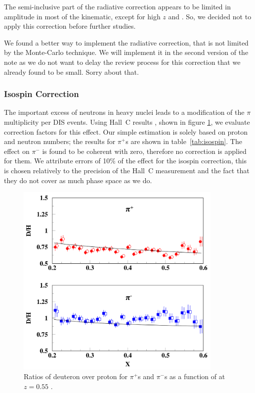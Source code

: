 The semi-inclusive part of the radiative correction appears to be limited 
in amplitude in most of the 
kinematic, except for high $z$ and \ptp. So, we decided not to apply this 
correction before further studies.

{\color{red} We found a better way to implement the radiative correction,
that is not limited by the Monte-Carlo technique. We will implement it in
the second version of the note as we do not want to delay the review process for
this correction that we already found to be small. Sorry about that.}

\subsubsection{Isospin Correction}

The important excess of neutrons in heavy nuclei leads to a modification of the 
$\pi$ multiplicity per DIS events. Using Hall~C results 
\cite{Asaturyan:2011mq}, shown in figure \ref{fig:IsoSpin}, we evaluate 
correction factors for this effect. Our simple estimation is solely based on 
proton and neutron numbers; the results for $\pi^+$s are shown in 
table~\ref{tab:isospin}. The effect on $\pi^-$ is found to be coherent with zero,
therefore no correction is applied for them. 
We attribute errors of 10\% of the effect for the isospin correction, this is chosen 
relatively to the precision of the Hall~C measurement and the fact that they do not 
cover as much phase space as we do.

\begin{figure}[tbp]
\centering
\includegraphics[width=10cm] {chap5-fig/HallC-Isospin.png}
\caption {Ratios of deuteron over proton for $\pi^+$s and $\pi^-$s 
as a function of \xb at $z=0.55$ \cite{Asaturyan:2011mq}.}
\label{fig:IsoSpin}
\end{figure}

